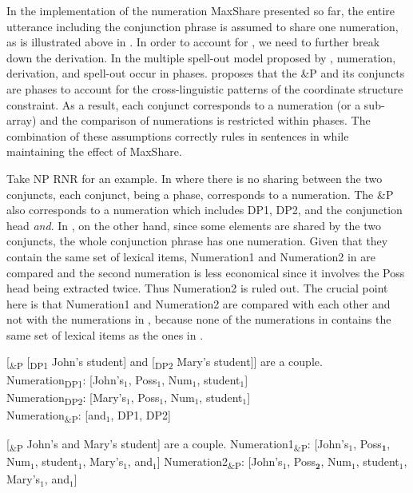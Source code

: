 \documentclass[output=paper]{langscibook}
\begin{document}
In the implementation of the numeration MaxShare presented so far, the entire utterance including the conjunction phrase is assumed to share one numeration, as is illustrated above in . In order to account for , we need to further break down the derivation. In the multiple spell-out model proposed by \citet{Uriagereka:1999a, Chomsky:2000}, numeration, derivation, and spell-out occur in phases. \citet{Oda:2017} proposes that the \&P and its conjuncts are phases to account for the cross-linguistic patterns of the coordinate structure constraint. 
As a result, each conjunct corresponds to a numeration (or a sub-array) and the comparison of numerations is restricted within phases. The combination of these assumptions correctly rules in sentences in  while maintaining the effect of MaxShare. 

Take NP RNR for an example. In  where there is no sharing between the two conjuncts, each conjunct, being a phase, corresponds to a numeration. The \&P also corresponds to a numeration which includes DP1, DP2, and the conjunction head \textit{and}.  In , on the other hand, since some elements are shared by the two conjuncts, the whole conjunction phrase has one numeration. Given that they contain the same set of lexical items, Numeration1 and Numeration2 in  are compared and the second numeration is less economical since it involves the Poss head being extracted twice. Thus Numeration2 is ruled out. The crucial point here is that Numeration1 and Numeration2 are compared with each other and not with the numerations in , because none of the numerations in  contains the same set of lexical items as the ones in . 

\ea 
\label{shenex22}
[\textsubscript{\&P} [\textsubscript{DP1} John's student] and [\textsubscript{DP2} Mary's student]] are a couple.\\
Numeration\textsubscript{DP1}: [John's$_1$, Poss$_1$, Num$_1$, student$_1$]\\
Numeration\textsubscript{DP2}: [Mary's$_1$, Poss$_1$, Num$_1$, student$_1$]\\
Numeration\textsubscript{\&P}: [and$_1$, DP1, DP2]

\ex
\label{shenex23}
[\textsubscript{\&P} John's and Mary's student] are a couple.
\ea 
	Numeration1\textsubscript{\&P}: [John's$_1$, Poss$_\textbf{1}$, Num$_1$, student$_1$, Mary's$_1$, and$_1$]
\ex 
	Numeration2\textsubscript{\&P}: [John's$_1$, Poss$_\textbf{2}$, Num$_1$, student$_1$, Mary's$_1$, and$_1$]
\z 
\z 
\end{document}
